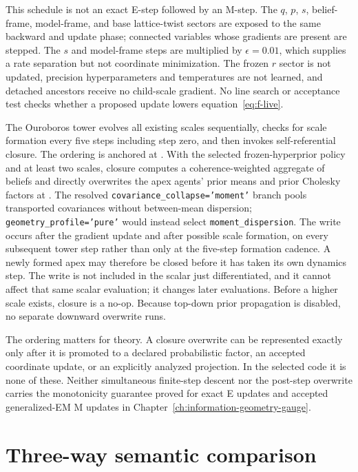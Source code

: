 This schedule is not an exact E-step followed by an M-step. The $q$, $p$, $s$, belief-frame, model-frame, and base lattice-twist sectors are exposed to the same backward and update phase; connected variables whose gradients are present are stepped. The $s$ and model-frame steps are multiplied by $\epsilon=0.01$, which supplies a rate separation but not coordinate minimization. The frozen $r$ sector is not updated, precision hyperparameters and temperatures are not learned, and detached ancestors receive no child-scale gradient. No line search or acceptance test checks whether a proposed update lowers equation~\eqref{eq:f-live}.

The Ouroboros tower evolves all existing scales sequentially, checks for scale formation every five steps including step zero, and then invokes self-referential closure. The ordering is anchored at . With the selected frozen-hyperprior policy and at least two scales, closure computes a coherence-weighted aggregate of beliefs and directly overwrites the apex agents' prior means and prior Cholesky factors at . The resolved \texttt{covariance\_collapse='moment'} branch pools transported covariances without between-mean dispersion; \texttt{geometry\_profile='pure'} would instead select \texttt{moment\_dispersion}. The write occurs after the gradient update and after possible scale formation, on every subsequent tower step rather than only at the five-step formation cadence. A newly formed apex may therefore be closed before it has taken its own dynamics step. The write is not included in the scalar just differentiated, and it cannot affect that same scalar evaluation; it changes later evaluations. Before a higher scale exists, closure is a no-op. Because top-down prior propagation is disabled, no separate downward overwrite runs.

The ordering matters for theory. A closure overwrite can be represented exactly only after it is promoted to a declared probabilistic factor, an accepted coordinate update, or an explicitly analyzed projection. In the selected code it is none of these. Neither simultaneous finite-step descent nor the post-step overwrite carries the monotonicity guarantee proved for exact E updates and accepted generalized-EM M updates in Chapter~\ref{ch:information-geometry-gauge}.

\section{Three-way semantic comparison}

